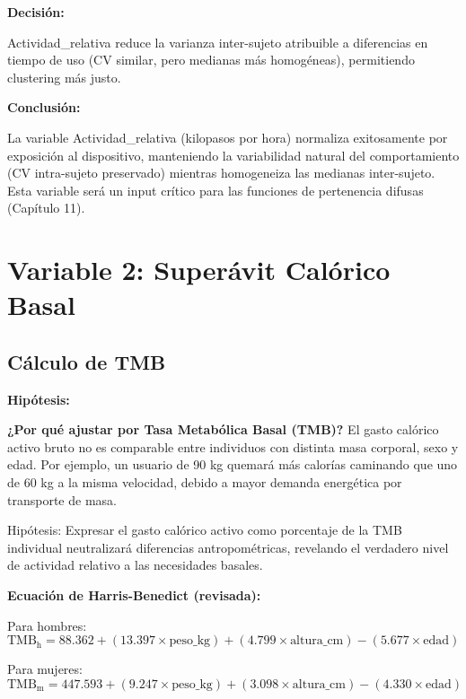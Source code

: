 \documentclass[12pt,letterpaper,twoside]{report}
\begin{document}
\begin{decisionbox}
\textbf{Decisión:}

Actividad\_relativa reduce la varianza inter-sujeto atribuible a diferencias en tiempo de uso (CV similar, pero medianas más homogéneas), permitiendo clustering más justo.
\end{decisionbox}

\begin{conclusionbox}
\textbf{Conclusión:}

La variable Actividad\_relativa (kilopasos por hora) normaliza exitosamente por exposición al dispositivo, manteniendo la variabilidad natural del comportamiento (CV intra-sujeto preservado) mientras homogeneiza las medianas inter-sujeto. Esta variable será un input crítico para las funciones de pertenencia difusas (Capítulo 11).
\end{conclusionbox}

\section{Variable 2: Superávit Calórico Basal}

\subsection{Cálculo de TMB}

\begin{hipotesisbox}
\textbf{Hipótesis:}

\textbf{¿Por qué ajustar por Tasa Metabólica Basal (TMB)?} El gasto calórico activo bruto no es comparable entre individuos con distinta masa corporal, sexo y edad. Por ejemplo, un usuario de 90 kg quemará más calorías caminando que uno de 60 kg a la misma velocidad, debido a mayor demanda energética por transporte de masa.

Hipótesis: Expresar el gasto calórico activo como porcentaje de la TMB individual neutralizará diferencias antropométricas, revelando el verdadero nivel de actividad relativo a las necesidades basales.
\end{hipotesisbox}

\begin{estadisticobox}
\textbf{Ecuación de Harris-Benedict (revisada):}

Para hombres:
\begin{equation}
\text{TMB}_{\text{h}} = 88.362 + (13.397 \times \text{peso\_kg}) + (4.799 \times \text{altura\_cm}) - (5.677 \times \text{edad})
\end{equation}

Para mujeres:
\begin{equation}
\text{TMB}_{\text{m}} = 447.593 + (9.247 \times \text{peso\_kg}) + (3.098 \times \text{altura\_cm}) - (4.330 \times \text{edad})
\end{equation}
\end{estadisticobox}
\end{document}
